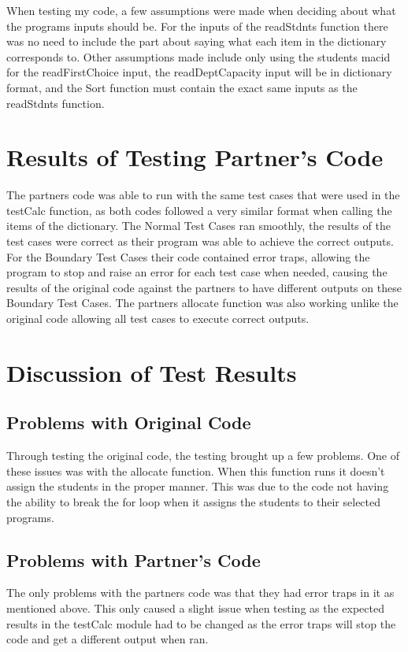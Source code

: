 \documentclass[12pt]{article}
\begin{document}
When testing my code, a few assumptions were made when deciding about what the programs inputs should be. For the inputs of the readStdnts function there was no need to include the part about saying what each item in the dictionary corresponds to. Other assumptions made include only using the students macid for the readFirstChoice input, the readDeptCapacity input will be in dictionary format, and the Sort function must contain the exact same inputs as the readStdnts function.


\section{Results of Testing Partner's Code}

The partners code was able to run with the same test cases that were used in the testCalc function, as both codes followed a very similar format when calling the items of the dictionary. The Normal Test Cases ran smoothly, the results of the test cases were correct as their program was able to achieve the correct outputs. For the Boundary Test Cases their code contained error traps, allowing the program to stop and raise an error for each test case when needed, causing the results of the original code against the partners to have different outputs on these Boundary Test Cases. The partners allocate function was also working unlike the original code allowing all test cases to execute correct outputs.

\section{Discussion of Test Results}

\subsection{Problems with Original Code}
Through testing the original code, the testing brought up a few problems. One of these issues was with the allocate function. When this function runs it doesn't assign the students in the proper manner. This was due to the code not having the ability to break the for loop when it assigns the students to their selected programs.

\subsection{Problems with Partner's Code}
The only problems with the partners code was that they had error traps in it as mentioned above. This only caused a slight issue when testing as the expected results in the testCalc module had to be changed as the error traps will stop the code and get a different output when ran.
\end{document}
